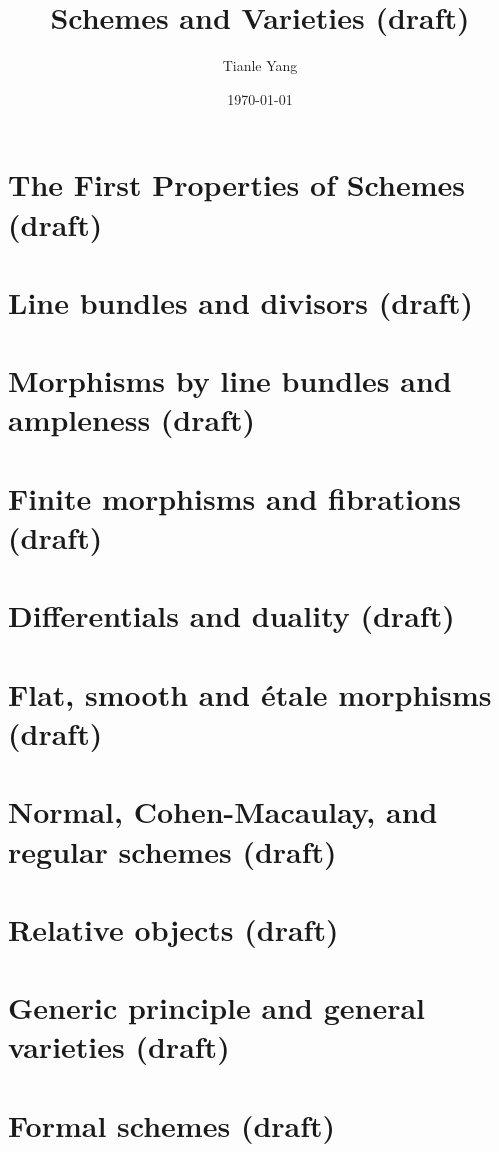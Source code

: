 \documentclass[sectionlevel=chapter]{noteformyself}
\title{Schemes and Varieties (draft)}
\author{Tianle Yang}
\date{\today}
\begin{document}
    \maketitle

    \tableofcontents

    \section{The First Properties of Schemes (draft)}
    
    \section{Line bundles and divisors (draft)}
    
    \section{Morphisms by line bundles and ampleness (draft)}
    
    \section{Finite morphisms and fibrations (draft)}
    
    \section{Differentials and duality (draft)}
    
    \section{Flat, smooth and étale morphisms (draft)}
    
    \section{Normal, Cohen-Macaulay, and regular schemes (draft)}
    
    \section{Relative objects (draft)}
    
    \section{Generic principle and general varieties (draft)}
    
    \section{Formal schemes (draft)}
    

    \printbibliography[heading=bibintoc, title={References}]
    
\end{document}
